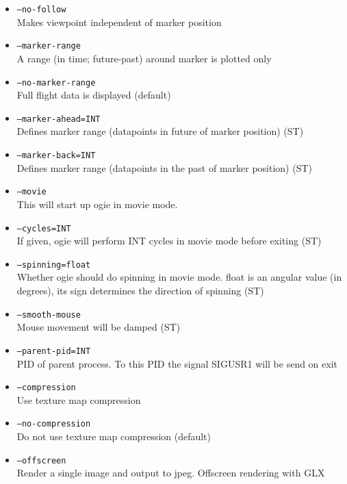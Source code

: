 \begin{itemize}
\item \texttt{--no-follow} \\
Makes viewpoint independent of marker position

\item \texttt{--marker-range} \\
A range (in time; future-past) around marker is plotted only

\item \texttt{--no-marker-range} \\
Full flight data is displayed (default)

\item \texttt{--marker-ahead=INT} \\
Defines marker range (datapoints in future of marker position) (ST)

\item \texttt{--marker-back=INT} \\
Defines marker range (datapoints in the past of marker position) (ST)

\item \texttt{--movie} \\
This will start up ogie in movie mode.

\item \texttt{--cycles=INT} \\
If given, ogie will perform INT cycles in movie mode before exiting (ST)

\item \texttt{--spinning=float} \\
Whether ogie should do spinning in movie mode. float is an angular value (in degrees),
its sign determines the direction of spinning (ST)


\item \texttt{--smooth-mouse} \\
Mouse movement will be damped (ST)

\item \texttt{--parent-pid=INT} \\
PID of parent process. To this PID the signal SIGUSR1 will be send on exit

\item \texttt{--compression} \\
Use texture map compression

\item \texttt{--no-compression} \\
Do not use texture map compression (default)

\item \texttt{--offscreen} \\
Render a single image and output to jpeg. Offscreen rendering with GLX


\end{itemize}
